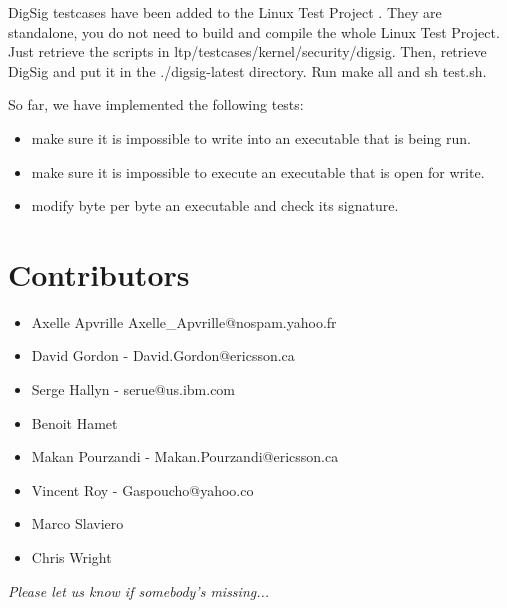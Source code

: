 \documentclass{article}
\begin{document}
DigSig testcases have been added to the Linux Test Project \cite{ltp}. They are standalone, you do not
need to build and compile the whole Linux Test Project. Just retrieve the scripts
in ltp/testcases/kernel/security/digsig.
Then, retrieve DigSig and put it in the ./digsig-latest directory.
Run make all and sh test.sh.

So far, we have implemented the following tests:
\begin{itemize}
\item make sure it is impossible to write into an executable that is being run.
\item make sure it is impossible to execute an executable that is open for write.
\item modify byte per byte an executable and check its signature.
\end{itemize}

\section{Contributors}

\begin{itemize}
\item Axelle Apvrille {\normalsize Axelle\_Apvrille@nospam.yahoo.fr}
\item David Gordon - {\normalsize David.Gordon@ericsson.ca}
\item Serge Hallyn - {\normalsize serue@us.ibm.com}
\item Benoit Hamet
\item Makan Pourzandi - {\normalsize Makan.Pourzandi@ericsson.ca}
\item Vincent Roy - {\normalsize Gaspoucho@yahoo.co}
\item Marco Slaviero
\item Chris Wright
\end{itemize}

{\it Please let us know if somebody's missing... }
\end{document}

